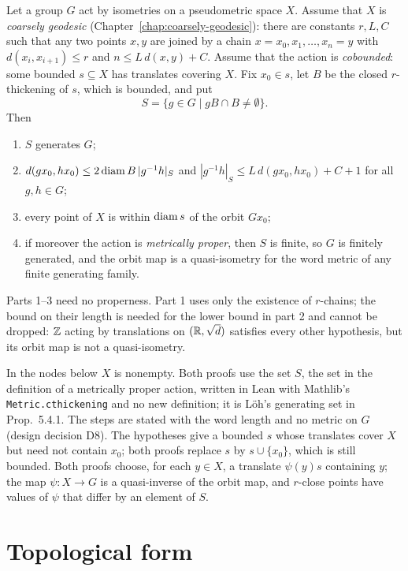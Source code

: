 Let a group $G$ act by isometries on a pseudometric space $X$. Assume that $X$ is
\emph{coarsely geodesic} (Chapter~\ref{chap:coarsely-geodesic}): there are constants $r, L, C$
such that any two points $x, y$ are joined by a chain $x = x_0, x_1, \dots, x_n = y$ with
$d(x_i, x_{i+1}) \le r$ and $n \le L\,d(x, y) + C$. Assume that the action is \emph{cobounded}:
some bounded $s \subseteq X$ has translates covering $X$. Fix $x_0 \in s$, let $B$ be the closed
$r$-thickening of $s$, which is bounded, and put
\[ S = \{g \in G \mid g B \cap B \ne \emptyset\}. \]
Then
\begin{enumerate}
  \item $S$ generates $G$;
  \item $d(g x_0, h x_0) \le 2 \operatorname{diam} B\,|g^{-1}h|_S$ and
        $|g^{-1}h|_S \le L\,d(g x_0, h x_0) + C + 1$ for all $g, h \in G$;
  \item every point of $X$ is within $\operatorname{diam} s$ of the orbit $G x_0$;
  \item if moreover the action is \emph{metrically proper}, then $S$ is finite, so $G$ is
        finitely generated, and the orbit map is a quasi-isometry for the word metric of any
        finite generating family.
\end{enumerate}
Parts 1--3 need no properness. Part 1 uses only the existence of $r$-chains; the bound on their
length is needed for the lower bound in part 2 and cannot be dropped: $\mathbb{Z}$ acting by
translations on $(\mathbb{R}, \sqrt{d})$ satisfies every other hypothesis, but its orbit map is not a
quasi-isometry.

In the nodes below $X$ is nonempty. Both proofs use the set $S$, the set in the definition of a
metrically proper action, written in Lean with Mathlib's
\texttt{Metric.cthickening} and no new definition; it is L\"oh's generating set in Prop.~5.4.1.
The steps are stated with the word length and no metric on $G$ (design decision D8). The
hypotheses give a bounded $s$ whose translates cover $X$ but need not contain $x_0$; both proofs
replace $s$ by $s \cup \{x_0\}$, which is still bounded. Both proofs choose, for each $y \in X$, a
translate $\psi(y) s$ containing $y$; the map $\psi \colon X \to G$ is a quasi-inverse of the orbit
map, and $r$-close points have values of $\psi$ that differ by an element of $S$.



\section{Topological form}

